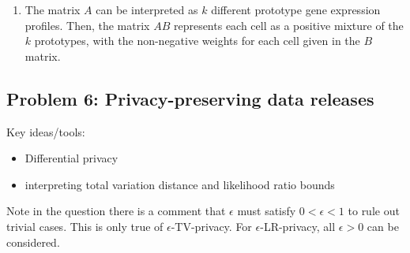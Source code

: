 \begin{enumerate}[label=(\alph*)]
\item
  The matrix $A$ can be interpreted as $k$ different prototype gene expression profiles. Then, the matrix $AB$ represents each cell as a positive mixture of the $k$ prototypes, with the non-negative weights for each cell given in the $B$ matrix.

\end{enumerate}

\subsection*{Problem 6: Privacy-preserving data releases}
Key ideas/tools:
\begin{itemize}
  \item Differential privacy
  \item interpreting total variation distance and likelihood ratio bounds
\end{itemize}

Note in the question there is a comment that $\epsilon$ must satisfy $0< \epsilon < 1$ to rule out trivial cases. This is only true of $\epsilon$-TV-privacy. For $\epsilon$-LR-privacy, all $\epsilon > 0$ can be considered. 

